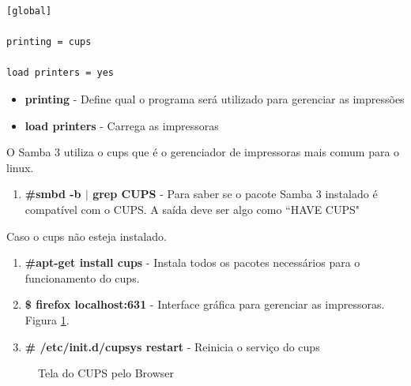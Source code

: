 \begin{lstlisting}[caption=Variáveis para permitir impressão em impressoras compartilhadas,label={smb_print}]	
[global]

printing = cups

load printers = yes	
\end{lstlisting}

\begin{itemize}
	\item \textbf{printing} - Define qual o programa será utilizado para gerenciar as impressões 
	\item \textbf{load printers} - Carrega as impressoras
\end{itemize}

O Samba 3 utiliza o cups que é o gerenciador de impressoras mais comum para o linux.

\begin{enumerate}
	\item \textbf{\#smbd -b $|$ grep CUPS} - Para saber se o pacote Samba 3 instalado é compatível com o CUPS. A saída deve ser algo como ``HAVE CUPS"
\end{enumerate}

Caso o cups não esteja instalado.

\begin{enumerate}
	\item \textbf{\#apt-get install cups} - Instala todos os pacotes necessários para o funcionamento do cups.
	\item \textbf{\$ firefox localhost:631} - Interface gráfica para gerenciar as impressoras. Figura \ref{cups}.
	\item \textbf{\# /etc/init.d/cupsys restart} - Reinicia o serviço do cups
\end{enumerate}

\begin{figure}[ht]
   	\centering
   	\caption{Tela do CUPS pelo Browser}
    \label{cups}
\end{figure}

